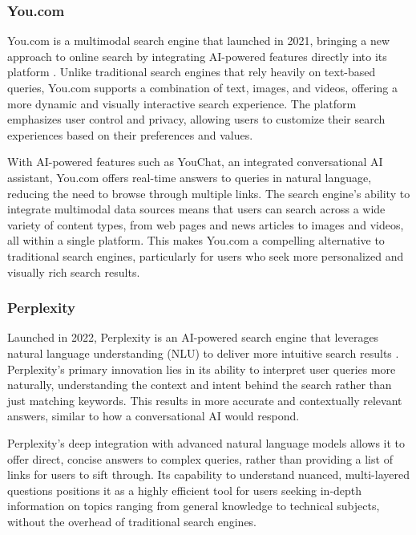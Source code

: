\subsubsection{You.com}

You.com is a multimodal search engine that launched in 2021, bringing a new approach to online search by integrating AI-powered features directly into its platform \cite{You.com}. 
Unlike traditional search engines that rely heavily on text-based queries, You.com supports a combination of text, images, and videos, offering a more dynamic and visually interactive search experience. 
The platform emphasizes user control and privacy, allowing users to customize their search experiences based on their preferences and values.

With AI-powered features such as YouChat, an integrated conversational AI assistant, You.com offers real-time answers to queries in natural language, reducing the need to browse through multiple links. 
The search engine's ability to integrate multimodal data sources means that users can search across a wide variety of content types, from web pages and news articles to images and videos, all within a single platform. 
This makes You.com a compelling alternative to traditional search engines, particularly for users who seek more personalized and visually rich search results.

\subsubsection{Perplexity}

Launched in 2022, Perplexity is an AI-powered search engine that leverages natural language understanding (NLU) to deliver more intuitive search results \cite{Perplexity}. 
Perplexity's primary innovation lies in its ability to interpret user queries more naturally, understanding the context and intent behind the search rather than just matching keywords. 
This results in more accurate and contextually relevant answers, similar to how a conversational AI would respond.

Perplexity's deep integration with advanced natural language models allows it to offer direct, concise answers to complex queries, rather than providing a list of links for users to sift through. 
Its capability to understand nuanced, multi-layered questions positions it as a highly efficient tool for users seeking in-depth information on topics ranging from general knowledge to technical subjects, without the overhead of traditional search engines.

